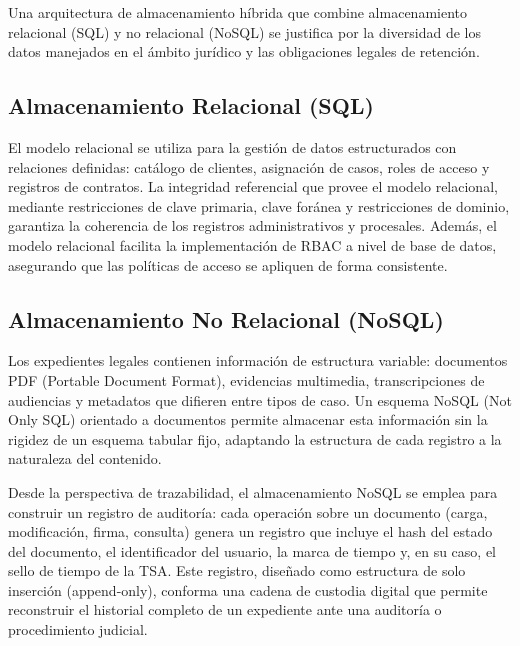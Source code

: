 Una arquitectura de almacenamiento híbrida que combine almacenamiento relacional (SQL) y no relacional (NoSQL) se justifica por la diversidad de los datos manejados en el ámbito jurídico y las obligaciones legales de retención.

\subsection{Almacenamiento Relacional (SQL)}\label{sec:almacenamiento-sql}

El modelo relacional se utiliza para la gestión de datos estructurados con relaciones definidas: catálogo de clientes, asignación de casos, roles de acceso y registros de contratos. La integridad referencial que provee el modelo relacional, mediante restricciones de clave primaria, clave foránea y restricciones de dominio, garantiza la coherencia de los registros administrativos y procesales. Además, el modelo relacional facilita la implementación de RBAC a nivel de base de datos, asegurando que las políticas de acceso se apliquen de forma consistente.

\subsection{Almacenamiento No Relacional (NoSQL)}\label{sec:almacenamiento-nosql}

Los expedientes legales contienen información de estructura variable: documentos PDF (Portable Document Format), evidencias multimedia, transcripciones de audiencias y metadatos que difieren entre tipos de caso. Un esquema NoSQL (Not Only SQL) orientado a documentos permite almacenar esta información sin la rigidez de un esquema tabular fijo, adaptando la estructura de cada registro a la naturaleza del contenido.

Desde la perspectiva de trazabilidad, el almacenamiento NoSQL se emplea para construir un registro de auditoría: cada operación sobre un documento (carga, modificación, firma, consulta) genera un registro que incluye el hash del estado del documento, el identificador del usuario, la marca de tiempo y, en su caso, el sello de tiempo de la TSA. Este registro, diseñado como estructura de solo inserción (append-only), conforma una cadena de custodia digital que permite reconstruir el historial completo de un expediente ante una auditoría o procedimiento judicial.
